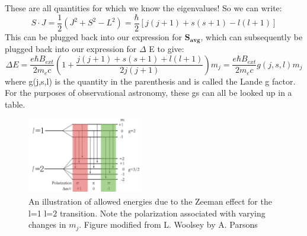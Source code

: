 \documentclass{article}
\begin{document}
These are all quantities for which we know the eigenvalues! So we can write:
\begin{equation}
S \cdot J = \frac{1}{2}(J^2 +S^2 - L^2) = \frac{\hbar}{2}[j(j+1) +s(s+1) - l(l+1)]
\end{equation}
This can be plugged back into our expression for $\mathbf{S_{avg}}$, which can subsequently be plugged back into our expression for $\Delta$ E to give:
\begin{equation} 
\Delta E = \frac{e \hbar B_{ext}}{2m_ec} \left(1+ \frac{j(j+1) +s(s+1) +l(l+1)}{2j(j+1)}\right) m_j =  \frac{e \hbar B_{ext}}{2m_ec} g(j, s, l) m_j
\end{equation}
where g(j,s,l) is the quantity in the parenthesis and is called the Lande g factor. For the purposes of observational astronomy, these gs can all be looked up in a table. 

\begin{figure}
    \centering
    \includegraphics[width = 0.45\textwidth]{figures/800px-Zeeman_Splitting.png}
    \caption{An illustration of allowed energies due to the Zeeman effect for the l=1 l=2 transition. Note the polarization associated with varying changes in $m_j$. Figure modified from L. Woolsey by A. Parsons}
    \label{fig:zeeman}
\end{figure}
\end{document}
